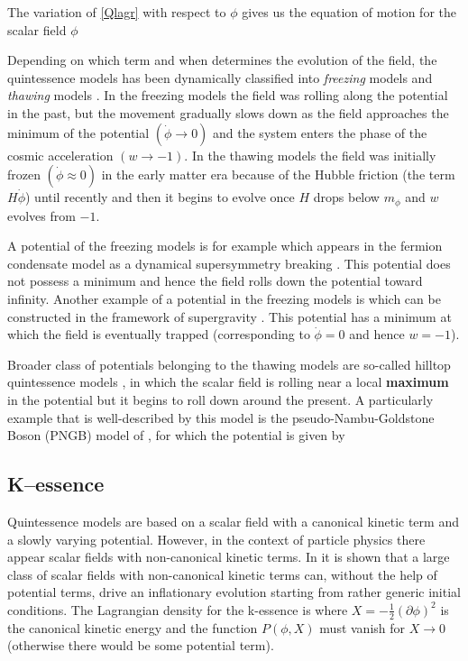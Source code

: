 The variation of \eqref{Qlagr} with respect to $\phi$ gives us the equation of motion for the scalar field $\phi$

Depending on which term and when determines the evolution of the field, the quintessence models has been dynamically classified into \textit{freezing} models and \textit{thawing} models \parencite{2005PhRvL..95n1301C}. In the freezing models the field was rolling along the potential in the past, but the movement gradually slows down as the field approaches the minimum of the potential $(\dot{\phi}\rightarrow0)$ and the system enters the phase of the cosmic acceleration $(w\rightarrow-1)$. In the thawing models the field was initially frozen $(\dot{\phi}\approx0)$ in the early matter era because of the Hubble friction (the term $H\dot{\phi}$) until recently and then it begins to evolve once $H$ drops below $m_\phi$ and $w$ evolves from $-1$.

A potential of the freezing models is for example
which appears in the fermion condensate model as a dynamical supersymmetry breaking \parencite{1999PhRvD..60f3502B}. This potential does not possess a minimum and hence the field rolls down the potential toward infinity. Another example of a potential in the freezing models is
which can be constructed in the framework of supergravity \parencite{1999PhLB..468...40B}. This potential has a minimum at which the field is eventually trapped (corresponding to $\dot{\phi}=0$ and hence $w=-1$).

Broader class of potentials belonging to the thawing models are so-called hilltop quintessence models \parencite{2008PhRvD..78l3525D}, in which the scalar field is rolling near a local \textbf{maximum} in the potential but it begins to roll down around the present. A particularly example that is well-described by this model is the pseudo-Nambu-Goldstone Boson (PNGB) model of \textcite{1995PhRvL..75.2077F}, for which the potential is given by
\subsection{K--essence}
Quintessence models are based on a scalar field with a canonical kinetic term and a slowly varying potential. However, in the context of particle physics there appear scalar fields with non-canonical kinetic terms. In \textcite{1999PhLB..458..209A} it is shown that a large class of scalar fields with non-canonical kinetic terms can, without the help of potential terms, drive an inflationary evolution starting from rather generic initial conditions. The Lagrangian density for the k-essence is
where $X=-\frac12(\partial\phi)^2$ is the canonical kinetic energy and the function $P(\phi, X)$ must vanish for $X\rightarrow0$ (otherwise there would be some potential term). 

